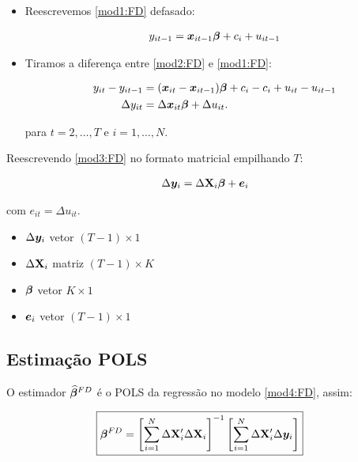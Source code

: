 \documentclass[11pt, oneside, a4paper, article]{article}
\numberwithin{equation}{section}
\begin{document}
\begin{itemize}\itemsep0pt
\item Reescrevemos \eqref{mod1:FD} defasado:

\vspace{-1 em}
\begin{align}  \label{mod2:FD}
	y_{it-1} = \boldsymbol{x}_{it-1} \boldsymbol{\beta} + c_{i} + u_{it-1}
\end{align}

\item Tiramos a diferença entre \eqref{mod2:FD} e \eqref{mod1:FD}:

\vspace{-1 em}
\begin{align}
\nonumber
y_{it} - y_{it-1} &=
(\boldsymbol{x}_{it} - \boldsymbol{x}_{it-1}) \boldsymbol{\beta} +
c_{i} - c_{i} +
u_{it} - u_{it-1}
\\
\label{mod3:FD}
\Delta y_{it} &=
\Delta \boldsymbol{x}_{it} \boldsymbol{\beta} +
\Delta u_{it}. 
\end{align}

\noindent
para
$t = 2, \dots, T$ e $i = 1, \dots, N$.
\end{itemize}

Reescrevendo \eqref{mod3:FD} no formato matricial empilhando $T$:

\vspace{-1 em}
\begin{align} \label{mod4:FD}
	\Delta \boldsymbol{y}_{i} = \Delta \mathbf{X}_{i} \boldsymbol{\beta} + \boldsymbol{e}_{i}
\end{align}

\noindent
com 
$\boxed{e_{it} = \Delta u_{it}}$.

\begin{itemize}\itemsep0pt
\item
$\Delta \boldsymbol{y}_{i}$ vetor $( T - 1 ) \times 1$ 
\item
$\Delta \mathbf{X}_{i}$  matriz  $( T - 1 ) \times K$
\item
$\boldsymbol{\beta}$ vetor $K \times 1$
\item
$\boldsymbol{e}_{i}$ vetor $(T - 1 ) \times 1$
\end{itemize}


\subsection{Estimação POLS}

O estimador $\widehat{\boldsymbol{\beta}}^{FD}$ é o POLS da regressão no modelo \eqref{mod4:FD}, assim:

\vspace{-1 em}
\begin{align} \label{beta:pols:FD}
\Aboxed{
\betavec^{FD} =
\left[ \sum_{i=1}^{N} \Delta \Xmat_{i}' \Delta \Xmat_{i} \right]^{-1}
\left[ \sum_{i=1}^{N} \Delta \Xmat_{i}' \Delta \yvec_{i} \right]
}
\end{align}
\end{document}
